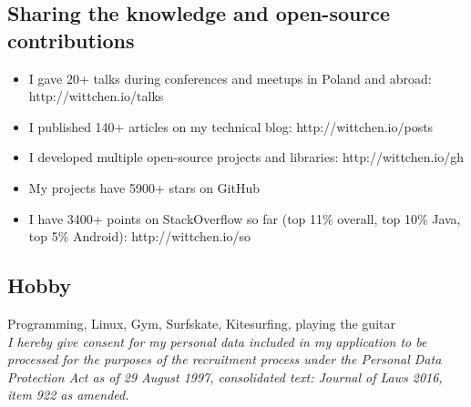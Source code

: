 \documentclass[8pt]{extarticle}
\begin{document}
    \subsection*{\normalsize{Sharing the knowledge and open-source contributions}}
    \begin{itemize}
      \item I gave 20+ talks during conferences and meetups in Poland and abroad: http://wittchen.io/talks
      \item I published 140+ articles on my technical blog: http://wittchen.io/posts
      \item I developed multiple open-source projects and libraries: http://wittchen.io/gh
      \item My projects have 5900+ stars on GitHub
      \item I have 3400+ points on StackOverflow so far (top 11\% overall, top 10\% Java, top 5\% Android): http://wittchen.io/so
    \end{itemize}

    \subsection*{\normalsize{Hobby}}
    Programming, Linux, Gym, Surfskate, Kitesurfing, playing the guitar\\

    \textit{
    I hereby give consent for my personal data included in my application
    to be processed for the purposes of the recruitment process
    under the Personal Data Protection Act as of 29 August 1997,
    consolidated text: Journal of Laws 2016, item 922 as amended.
    }
\end{document}
